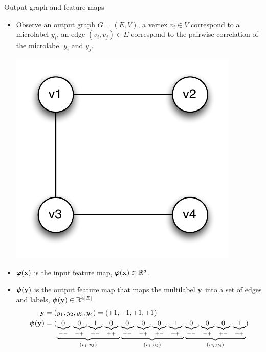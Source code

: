 \documentclass[first=dgreen,second=purple,logo=yellowexc]{aaltoslides}
\begin{document}
{\begin{frame}{Output graph and feature maps}
	\begin{itemize}
		\item Observe an output graph $G=(E,V)$, a vertex $v_i\in V$ correspond to a microlabel $y_i$, an edge $(v_i,v_j)\in E$ correspond to the pairwise correlation of the microlabel $y_i$ and $y_j$.
		\begin{center}
			\includegraphics[scale=0.3]{./figures/outputgraph.pdf}
		\end{center}
		\item $\pmb \varphi(\mathbf {x})$ is the  input feature map, $\pmb \varphi(\mathbf {x})\in\mathbb{R}^d$.
		\item $\pmb \psi(\mathbf {y})$ is the output feature map that maps the multilabel $\mathbf {y}$ into a set of edges and labels, $\pmb \psi(\mathbf {y})\in\mathbb{R}^{4|E|}$.
		\begin{align*}
			\mathbf {y}&=(y_1,y_2,y_3,y_4)=(+1,-1,+1,+1)\\
			\pmb \psi(\mathbf {y}) &= ( \underbrace{\underbrace{0}_{--}, \underbrace{0}_{-+}, \underbrace{1}_{+-}, \underbrace{0}_{++},}_{(v_1,v_3)} 
			\underbrace{\underbrace{0}_{--}, \underbrace{0}_{-+}, \underbrace{0}_{+-}, \underbrace{1}_{++},}_{(v_1,v_2)}
			\underbrace{\underbrace{0}_{--}, \underbrace{0}_{-+}, \underbrace{0}_{+-}, \underbrace{1}_{++}}_{(v_3,v_4)})
		\end{align*}
	\end{itemize}
\end{frame}


}
\end{document}

